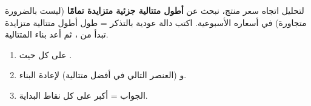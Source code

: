 \begin{statement}
لتحليل اتجاه سعر منتج، نبحث عن \textbf{أطول متتالية جزئية متزايدة تمامًا} (ليست بالضرورة متجاورة) في أسعاره الأسبوعية. اكتب دالة عودية بالتذكر  = طول أطول متتالية متزايدة تبدأ من ، ثم أعد بناء المتتالية.
\end{statement}
\begin{stepsbox}\begin{enumerate}
\item {} على كل  حيث .
\item {} و  (العنصر التالي في أفضل متتالية) لإعادة البناء.
\item الجواب = أكبر  على كل نقاط البداية.
\end{enumerate}\end{stepsbox}
